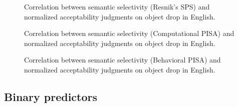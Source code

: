 

\begin{figure}[htb]
\caption{Correlation between semantic selectivity (Resnik's SPS) and normalized acceptability judgments on object drop in English.}
    
\end{figure}

\begin{figure}[htb]
\caption{Correlation between semantic selectivity (Computational PISA) and normalized acceptability judgments on object drop in English.}
    
\end{figure}

\begin{figure}[htb]
\caption{Correlation between semantic selectivity (Behavioral PISA) and normalized acceptability judgments on object drop in English.}
    
\end{figure}


\subsection{Binary predictors} 

